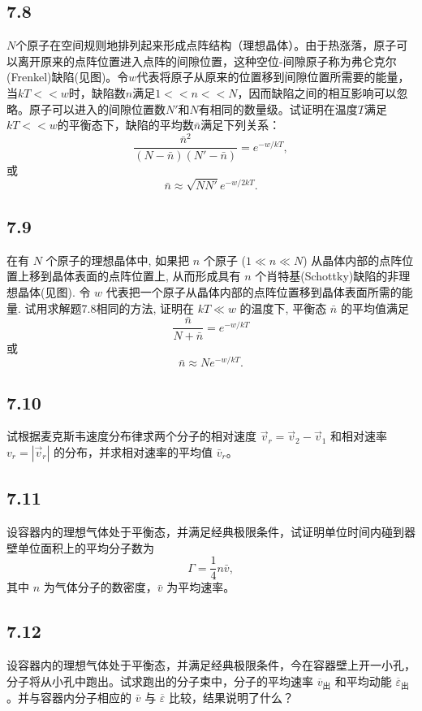 \newpage
\subsection{7.8}
$N$个原子在空间规则地排列起来形成点阵结构（理想晶体）。由于热涨落，原子可以离开原来的点阵位置进入点阵的间隙位置，这种空位-间隙原子称为弗仑克尔(Frenkel)缺陷(见图)。令$w$代表将原子从原来的位置移到间隙位置所需要的能量，当$kT<<w$时，缺陷数$n$满足$1<<n<<N$，因而缺陷之间的相互影响可以忽略。原子可以进入的间隙位置数$N'$和$N$有相同的数量级。试证明在温度$T$满足$kT<<w$的平衡态下，缺陷的平均数$\bar{n}$满足下列关系：
$$\frac{\bar{n}^2}{(N-\bar{n})(N'-\bar{n})} = e^{-w/kT},$$
或
$$\bar{n} \approx \sqrt{NN'} e^{-w/2kT}.$$

\newpage
\subsection{7.9}
在有 $N$ 个原子的理想晶体中, 如果把 $n$ 个原子 ($1 \ll n \ll N$) 从晶体内部的点阵位置上移到晶体表面的点阵位置上, 从而形成具有 $n$ 个肖特基(Schottky)缺陷的非理想晶体(见图). 令 $w$ 代表把一个原子从晶体内部的点阵位置移到晶体表面所需的能量. 试用求解题7.8相同的方法, 证明在 $kT \ll w$ 的温度下, 平衡态 $\bar{n}$ 的平均值满足
$$\frac{\bar{n}}{N+\bar{n}} = e^{-w/kT}$$
或
$$\bar{n} \approx Ne^{-w/kT}.$$

\newpage
\subsection{7.10}
试根据麦克斯韦速度分布律求两个分子的相对速度 $\vec{v}_r = \vec{v}_2 - \vec{v}_1$ 和相对速率 $v_r = |\vec{v}_r|$ 的分布，并求相对速率的平均值 $\bar{v}_r$。

\newpage
\subsection{7.11}
设容器内的理想气体处于平衡态，并满足经典极限条件，试证明单位时间内碰到器壁单位面积上的平均分子数为
$$\Gamma = \frac{1}{4} n\bar{v},$$
其中 $n$ 为气体分子的数密度，$\bar{v}$ 为平均速率。

\newpage
\subsection{7.12}
设容器内的理想气体处于平衡态，并满足经典极限条件，今在容器壁上开一小孔，分子将从小孔中跑出。试求跑出的分子束中，分子的平均速率 $\overline{v}_{\text{出}}$ 和平均动能 $\overline{\varepsilon}_{\text{出}}$。并与容器内分子相应的 $\bar{v}$ 与 $\overline{\varepsilon}$ 比较，结果说明了什么？

